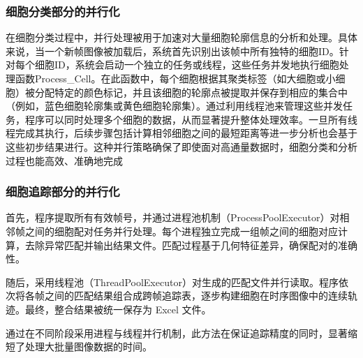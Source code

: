 \subsubsection{细胞分类部分的并行化}
在细胞分类过程中，并行处理被用于加速对大量细胞轮廓信息的分析和处理。具体来说，当一个新帧图像被加载后，系统首先识别出该帧中所有独特的细胞ID。针对每个细胞ID，系统会启动一个独立的任务或线程，这些任务并发地执行细胞处理函数Process\_Cell。在此函数中，每个细胞根据其聚类标签（如大细胞或小细胞）被分配特定的颜色标记，并且该细胞的轮廓点被提取并保存到相应的集合中（例如，蓝色细胞轮廓集或黄色细胞轮廓集）。通过利用线程池来管理这些并发任务，程序可以同时处理多个细胞的数据，从而显著提升整体处理效率。一旦所有线程完成其执行，后续步骤包括计算相邻细胞之间的最短距离等进一步分析也会基于这些初步结果进行。这种并行策略确保了即使面对高通量数据时，细胞分类和分析过程也能高效、准确地完成
\subsubsection{细胞追踪部分的并行化}
首先，程序提取所有有效帧号，并通过进程池机制（ProcessPoolExecutor）对相邻帧之间的细胞配对任务并行处理。每个进程独立完成一组帧之间的细胞对应计算，去除异常匹配并输出结果文件。匹配过程基于几何特征差异，确保配对的准确性。

随后，采用线程池（ThreadPoolExecutor）对生成的匹配文件并行读取。程序依次将各帧之间的匹配结果组合成跨帧追踪表，逐步构建细胞在时序图像中的连续轨迹。最终，整合结果被统一保存为 Excel 文件。

通过在不同阶段采用进程与线程并行机制，此方法在保证追踪精度的同时，显著缩短了处理大批量图像数据的时间。

